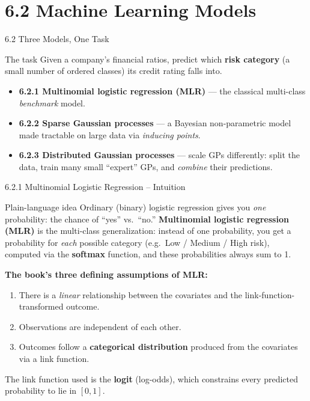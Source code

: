 \documentclass[aspectratio=169,10pt]{beamer}
\begin{document}
\section{6.2 Machine Learning Models}

\begin{frame}{6.2 Three Models, One Task}
  \begin{block}{The task}
    Given a company's financial ratios, predict which \textbf{risk category}
    (a small number of ordered classes) its credit rating falls into.
  \end{block}
  \begin{itemize}
    \item \textbf{6.2.1 Multinomial logistic regression (MLR)} --- the
          classical multi-class \emph{benchmark} model.
    \item \textbf{6.2.2 Sparse Gaussian processes} --- a Bayesian
          non-parametric model made tractable on large data via
          \emph{inducing points}.
    \item \textbf{6.2.3 Distributed Gaussian processes} --- scale GPs
          differently: split the data, train many small ``expert'' GPs,
          and \emph{combine} their predictions.
  \end{itemize}
\end{frame}

\begin{frame}{6.2.1 Multinomial Logistic Regression -- Intuition}
  \begin{block}{Plain-language idea}
    Ordinary (binary) logistic regression gives you \emph{one} probability:
    the chance of ``yes'' vs.\ ``no.'' \textbf{Multinomial logistic
    regression (MLR)} is the multi-class generalization: instead of one
    probability, you get a probability for \emph{each} possible category
    (e.g.\ Low / Medium / High risk), computed via the \textbf{softmax}
    function, and these probabilities always sum to 1.
  \end{block}
  \textbf{The book's three defining assumptions of MLR:}
  \begin{enumerate}
    \item There is a \emph{linear} relationship between the covariates and
          the link-function-transformed outcome.
    \item Observations are independent of each other.
    \item Outcomes follow a \textbf{categorical distribution} produced from
          the covariates via a link function.
  \end{enumerate}
  \vspace{0.2em}
  The link function used is the \textbf{logit} (log-odds), which constrains
  every predicted probability to lie in $[0,1]$.
\end{frame}
\end{document}
